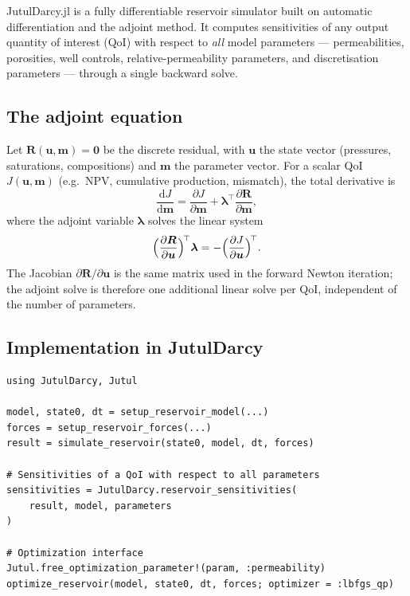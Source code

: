 \documentclass[10pt,a4paper]{article}
\newcommand{\dd}{\mathrm{d}}
\newcommand{\pd}[2]{\frac{\partial #1}{\partial #2}}
\begin{document}
JutulDarcy.jl is a fully differentiable reservoir simulator built on automatic
differentiation and the adjoint method. It computes sensitivities of any
output quantity of interest (QoI) with respect to \emph{all} model parameters
--- permeabilities, porosities, well controls, relative-permeability
parameters, and discretisation parameters --- through a single backward solve.

\subsection{The adjoint equation}

Let $\bm{R}(\bm{u},\bm{m})=\bm{0}$ be the discrete residual, with $\bm{u}$ the
state vector (pressures, saturations, compositions) and $\bm{m}$ the parameter
vector. For a scalar QoI $J(\bm{u},\bm{m})$ (e.g.\ NPV, cumulative production,
mismatch), the total derivative is
\begin{equation}
  \frac{\dd J}{\dd \bm{m}}
  = \pd{J}{\bm{m}}
  + \bm{\lambda}^{\!\top}\pd{\bm{R}}{\bm{m}},
  \label{eq:total-deriv}
\end{equation}
where the adjoint variable $\bm{\lambda}$ solves the linear system
\begin{equation}
  \Bigl(\pd{\bm{R}}{\bm{u}}\Bigr)^{\!\top}\bm{\lambda}
  = -\Bigl(\pd{J}{\bm{u}}\Bigr)^{\!\top}.
  \label{eq:adjoint}
\end{equation}
The Jacobian $\partial\bm{R}/\partial\bm{u}$ is the same matrix used in the
forward Newton iteration; the adjoint solve is therefore one additional linear
solve per QoI, independent of the number of parameters.

\subsection{Implementation in JutulDarcy}

\begin{lstlisting}[style=jl, caption={Adjoint-based gradients in JutulDarcy.}]
using JutulDarcy, Jutul

model, state0, dt = setup_reservoir_model(...)
forces = setup_reservoir_forces(...)
result = simulate_reservoir(state0, model, dt, forces)

# Sensitivities of a QoI with respect to all parameters
sensitivities = JutulDarcy.reservoir_sensitivities(
    result, model, parameters
)

# Optimization interface
Jutul.free_optimization_parameter!(param, :permeability)
optimize_reservoir(model, state0, dt, forces; optimizer = :lbfgs_qp)
\end{lstlisting}
\end{document}
